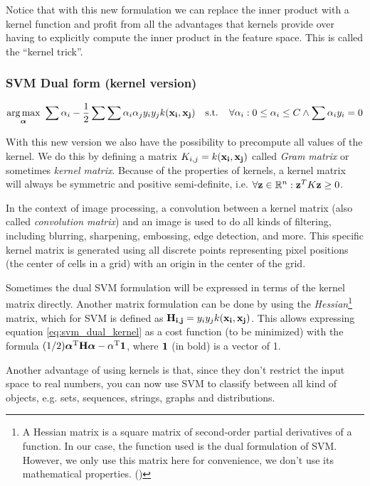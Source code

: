 Notice that with this new formulation we can replace the inner product with a kernel function and profit from all the advantages that kernels provide over having to explicitly compute the inner product in the feature space. This is called the “kernel trick”.

\subsubsection*{SVM Dual form (kernel version)}
\begin{align}\label{eq:svm_dual_kernel} 
    \underset{\boldsymbol{\alpha}}{\text{arg} \max}\ \sum \alpha_i - \frac{1}{2} \sum \sum \alpha_i \alpha_j y_i y_j k(\mathbf{x_i}, \mathbf{x_j})
    \text{\ \ \ s.t. \ \ } \forall \alpha_i : 0 \le \alpha_i \le C \land \sum \alpha_i y_i = 0
\end{align}

With this new version we also have the possibility to precompute all values of the kernel. We do this by defining a matrix $K_{i,j} = k(\mathbf{x_i}, \mathbf{x_j})$ called \emph{Gram matrix} or sometimes \emph{kernel matrix}. Because of the properties of kernels, a kernel matrix will always be symmetric and positive semi-definite, i.e. $\forall \mathbf{z} \in \mathbb{R}^n : \mathbf{z}^T K \mathbf{z} \ge 0$.

In the context of image processing, a convolution between a kernel matrix (also called \emph{convolution matrix}) and an image is used to do all kinds of filtering, including blurring, sharpening, embossing, edge detection, and more. This specific kernel matrix is generated using all discrete points representing pixel positions (the center of cells in a grid) with an origin in the center of the grid.

Sometimes the dual SVM formulation will be expressed in terms of the kernel matrix directly. Another matrix formulation can be done by using the \emph{Hessian}\footnote{A Hessian matrix is a square matrix of second-order partial derivatives of a function. In our case, the function used is the dual formulation of SVM. However, we only use this matrix here for convenience, we don't use its mathematical properties. (\cite{sontag_kernel_2013})} matrix, which for SVM is defined as $\mathbf{H_{i,j}} = y_iy_jk(\mathbf{x_i}, \mathbf{x_j})$. This allows expressing equation \ref{eq:svm_dual_kernel} as a cost function (to be minimized) with the formula $(1/2) \boldsymbol{\alpha}^{\text{T}} \mathbf{H} \boldsymbol{\alpha} - \alpha^{\text{T}} \mathbf{1}$, where $\mathbf{1}$ (in bold) is a vector of 1.

Another advantage of using kernels is that, since they don't restrict the input space to real numbers, you can now use SVM to classify between all kind of objects, e.g. sets, sequences, strings, graphs and distributions.

